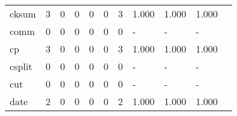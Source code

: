 \begin{longtable}{lp{1.20cm}p{1.20cm}p{1.20cm}p{1.20cm}p{1.20cm}p{1.20cm}p{1.20cm}p{1.20cm}p{1.20cm}p{1.20cm}}
cksum     &                                     3 &                                                  0 &                                                  0 &                                                  0 &                                                  0 &                                                  3 &                                         1.000 &                                              1.000 &                                              1.000 \\
comm      &                                     0 &                                                  0 &                                                  0 &                                                  0 &                                                  0 &                                                  0 &                                             - &                                                  - &                                                  - \\
cp        &                                     3 &                                                  0 &                                                  0 &                                                  0 &                                                  0 &                                                  3 &                                         1.000 &                                              1.000 &                                              1.000 \\
csplit    &                                     0 &                                                  0 &                                                  0 &                                                  0 &                                                  0 &                                                  0 &                                             - &                                                  - &                                                  - \\
cut       &                                     0 &                                                  0 &                                                  0 &                                                  0 &                                                  0 &                                                  0 &                                             - &                                                  - &                                                  - \\
date      &                                     2 &                                                  0 &                                                  0 &                                                  0 &                                                  0 &                                                  2 &                                         1.000 &                                              1.000 &                                              1.000 \\

\end{longtable}
